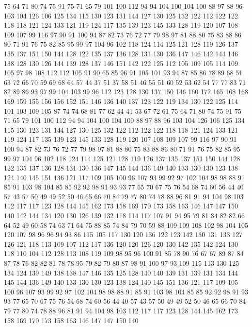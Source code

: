 75 64 71 80 74 75 91 75 71 65 79 101 100 112 94 94 104 100 104 100
88 97 88 96 103 104 126 106 125 134 115 130 123 131 144 127 130 125 132 122
112 122 122 118 118 121 124 133 121 119 124 117 135 139 123 145 133 128 119 120
107 108 109 107 99 116 97 90 91 100 94 87 82 73 76 72 77 79 98 97
81 88 80 75 83 88 86 80 71 91 76 75 82 85 95 99 97 104 96 102
118 124 114 125 121 128 119 126 137 135 137 151 150 144 128 122 135 137 136 128
131 130 136 147 146 142 144 146 138 128 130 126 144 139 128 137 146 151 142 122
125 112 105 109 105 114 109 105 97 98 108 112 112 105 91 90 65 85 96 91
105 101 93 94 87 85 86 78 89 68 51 63 72 66 70 59 69 68 64 57
44 37 51 37 58 51 46 55 51 60 52 53 62 54 77 77 83 71 82 89
86 93 97 99 104 103 99 96 112 123 128 130 137 150 146 160 172 165 168 168
169 159 155 156 156 152 151 146 136 140 137 123 122 119 134 130 122 125 114 101
103 109 105 87 74 74 68 81 77 62 44 41 53 67 72 61 75 64 71 80
74 75 91 75 71 65 79 101 100 112 94 94 104 100 104 100 88 97 88 96
103 104 126 106 125 134 115 130 123 131 144 127 130 125 132 122 112 122 122 118
118 121 124 133 121 119 124 117 135 139 123 145 133 128 119 120 107 108 109 107
99 116 97 90 91 100 94 87 82 73 76 72 77 79 98 97 81 88 80 75
83 88 86 80 71 91 76 75 82 85 95 99 97 104 96 102 118 124 114 125
121 128 119 126 137 135 137 151 150 144 128 122 135 137 136 128 131 130 136 147
145 144 136 149 140 133 130 130 123 138 124 140 145 151 136 121 117 109 105 100
96 107 93 99 92 97 102 104 98 98 88 91 85 91 103 98 104 85 85 92
92 98 91 93 93 77 65 70 67 75 76 54 68 74 60 56 44 40 57 43
57 50 49 49 52 50 46 65 66 70 84 79 77 80 74 78 88 96 81 91
94 104 98 103 112 117 117 123 128 144 145 162 173 158 169 170 173 158 163 146
147 147 150 140 142 144 134 120 130 126 139 132 118 114 117 107 91 94 95 79
81 84 82 82 66 64 52 49 60 58 74 63 71 64 75 88 85 74 84 79
70 59 88 109 109 108 102 98 104 105 120 107 98 96 96 94 93 86 115 105
117 130 120 136 122 123 142 130 131 133 127 126 121 118 113 109 107 112 117 136
120 120 126 120 130 142 135 142 124 130 118 110 104 112 128 113 108 119 109 98
95 96 100 91 85 78 90 76 67 67 89 87 84 87 78 76 82 82 81 78
78 95 79 82 79 80 87 98 91 100 97 93 109 115 113 130 125 134 124 139
149 138 138 147 146 135 125 128 140 140 139 131 139 131 134 144 145 144 136 149
140 133 130 130 123 138 124 140 145 151 136 121 117 109 105 100 96 107 93 99
92 97 102 104 98 98 88 91 85 91 103 98 104 85 85 92 92 98 91 93
93 77 65 70 67 75 76 54 68 74 60 56 44 40 57 43 57 50 49 49
52 50 46 65 66 70 84 79 77 80 74 78 88 96 81 91 94 104 98 103
112 117 117 123 128 144 145 162 173 158 169 170 173 158 163 146 147 147 150 140
